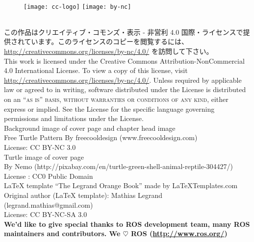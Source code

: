\documentclass[11pt,fleqn]{book} %
\begin{document}
\noindent{\LARGE [ライセンス]}\\
\begin{figure}[htp]
\centering
\texttt{[image: cc-logo]}
\hspace{10pt}
\texttt{[image: by-nc]}
\end{figure}
\normalsize\\
\noindent この作品はクリエイティブ・コモンズ・表示 - 非営利 4.0 国際・ライセンスで提供されています。このライセンスのコピーを閲覧するには、 \url{http://creativecommons.org/licenses/by-nc/4.0/} を訪問して下さい。\\

\noindent This work is licensed under the Creative Commons Attribution-NonCommercial 4.0 International License. To view a copy of this license, visit \url{http://creativecommons.org/licenses/by-nc/4.0/}. Unless required by applicable law or agreed to in writing, software distributed under the License is distributed on an \textsc{``as is'' basis, without warranties or conditions of any kind}, either express or implied. See the License for the specific language governing permissions and limitations under the License.\\ %

\noindent Background image of cover page and chapter head image\\
Free Turtle Pattern By freecooldesign (www.freecooldesign.com)\\
License: CC BY-NC 3.0\\

\noindent Turtle image of cover page\\
By Nemo (http://pixabay.com/en/turtle-green-shell-animal-reptile-304427/)\\
License : CC0 Public Domain\\

\noindent LaTeX template ``The Legrand Orange Book'' made by LaTeXTemplates.com\\
Original author (LaTeX template): Mathias Legrand (legrand.mathias@gmail.com)\\
License: CC BY-NC-SA 3.0\\

\noindent \textbf{We'd like to give special thanks to ROS development team, many ROS maintainers and contributors. We $\heartsuit$ ROS (\url{http://www.ros.org/})}

\newpage
\thispagestyle{empty}
\end{document}
